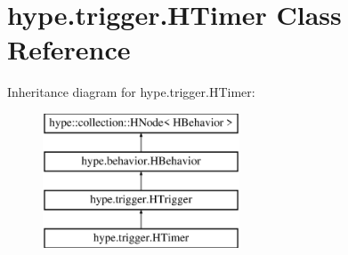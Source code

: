 \hypertarget{classhype_1_1trigger_1_1_h_timer}{\section{hype.\-trigger.\-H\-Timer Class Reference}
\label{classhype_1_1trigger_1_1_h_timer}
}
Inheritance diagram for hype.\-trigger.\-H\-Timer\-:\begin{figure}[H]
\begin{center}
\leavevmode
\includegraphics[height=4.000000cm]{classhype_1_1trigger_1_1_h_timer}
\end{center}
\end{figure}
